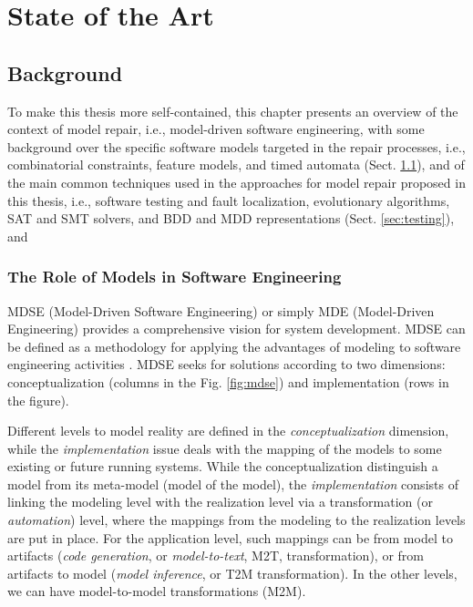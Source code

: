 \documentclass [a4paper, 12pt, twoside]{report}
\theoremstyle{plain}
\theoremstyle{definition}
\theoremstyle{remark}
\theoremstyle{plain}
\theoremstyle{plain}
\theoremstyle{remark}
\begin{document}
\part{State of the Art}

\chapter{Background}\label{ch:background}

To make this thesis more self-contained, this chapter presents an overview of the context of model repair, i.e., model-driven software engineering, with some background over the specific software models targeted in the repair processes, i.e., combinatorial constraints, feature models, and timed automata (Sect. \ref{sec:modeldriven}), and of the main common techniques used in the approaches for model repair proposed in this thesis, i.e., software testing and fault localization, evolutionary algorithms, SAT and SMT solvers, and BDD and MDD representations (Sect. \ref{sec:testing}), and 

\section{The Role of Models in Software Engineering}\label{sec:modeldriven}

MDSE (Model-Driven Software Engineering) or simply MDE (Model-Driven Engineering) provides a comprehensive vision for system development. 
MDSE can be defined as a methodology for applying the advantages of modeling to software engineering activities \cite{brambillaModelDriven}.
MDSE seeks for solutions according to two dimensions: conceptualization (columns in the Fig. \ref{fig:mdse}) and implementation (rows in the figure).

Different levels to model reality are defined in the \textit{conceptualization} dimension, 
while the \textit{implementation} issue deals with the mapping of the models to some existing or future running systems. 
While the conceptualization distinguish a model from its meta-model (model of the model), the \textit{implementation} consists of linking the modeling level with the realization level via a transformation (or \textit{automation}) level, where the mappings from the modeling to the realization levels are put in place.
For the application level, such mappings can be from model to artifacts (\textit{code generation}, or \textit{model-to-text}, M2T, transformation), or from artifacts to model (\textit{model inference}, or T2M transformation). In the other levels, we can have model-to-model transformations (M2M).
\end{document}
